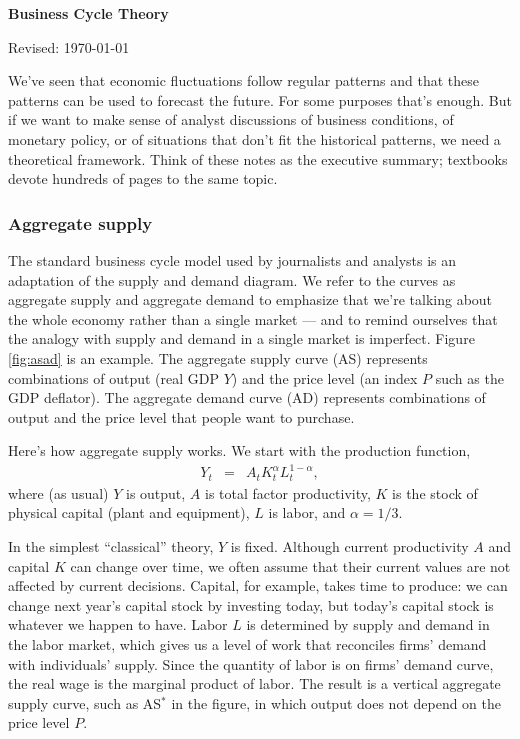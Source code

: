 \documentclass[letterpaper,12pt]{article}
\def\HeadName{Business Cycle Theory}
\begin{document}
\thispagestyle{empty}%
\Head

\centerline{\large \bf \HeadName}%
\centerline{Revised: \today}

\bigskip
We've seen that economic fluctuations follow regular patterns 
and that these patterns can be used to forecast the future.  
For some purposes that's enough.
But if we want to make sense of analyst discussions of business conditions,  
of monetary policy, 
or of situations that don't fit the historical patterns, 
we need a theoretical framework.  
Think of these notes as the executive summary; 
textbooks devote hundreds of pages to the same topic.  


\subsubsection*{Aggregate supply}

The standard business cycle model used by journalists and analysts 
is an adaptation of the supply and demand diagram.
We refer to the curves as aggregate supply and aggregate 
demand to emphasize that we're talking about the whole economy 
rather than a single market --- 
and to remind ourselves that the analogy with supply and demand 
in a single market is imperfect.   
Figure \ref{fig:asad} is an example.  
The aggregate supply curve (AS) represents combinations of 
output (real GDP $Y$) and the price level 
(an index $P$ such as the GDP deflator).    
The aggregate demand curve (AD) 
represents combinations of output and the price 
level that people want to purchase. 

Here's how aggregate supply works.  
We start with the production function, 
\begin{eqnarray}
    Y_t &=& A_t K_t^\alpha L_t^{1-\alpha} ,
\end{eqnarray}
where (as usual) $Y$ is output, $A$ is total factor productivity, 
$K$ is the stock of physical capital (plant and equipment), 
$L$ is labor, and $ \alpha = 1/3$.  

In the simplest ``classical'' theory, $Y$ is fixed.  
Although current productivity $A$ and capital $K$ can change over time, 
we often assume that their current values are not affected by current decisions.  Capital, for example, takes time to produce:
we can change next year's capital stock by investing today, 
but today's capital stock is whatever we happen to have.  
Labor $L$ is determined by supply and demand in the labor market, 
which gives us a level of work that reconciles firms' 
demand with individuals' supply.  
Since the quantity of labor is on firms' demand curve, 
the real wage is the marginal product of labor.
The result is a vertical aggregate supply curve, 
such as AS$^*$ in the figure, 
in which output does not depend on the price level $P$.  
\end{document}
